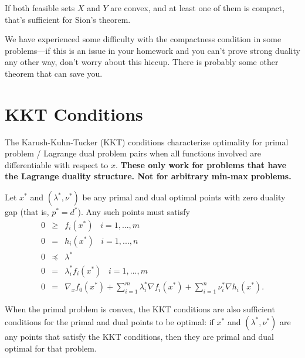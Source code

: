\documentclass[12pt]{article}
\begin{document}
If both feasible sets $X$ and $Y$ are convex, and at least one of them is compact, that's sufficient for Sion's theorem. 

We have experienced some difficulty with the compactness condition in some problems---if this is an issue in your homework and you can't prove strong duality any other way, don't worry about this hiccup. There is probably some other theorem that can save you. 

\pagebreak

\section{KKT Conditions}


The Karush-Kuhn-Tucker (KKT) conditions characterize optimality for primal problem / Lagrange dual problem pairs when all functions involved are differentiable with respect to $x$. \textbf{These only work for problems that have the Lagrange duality structure. Not for arbitrary min-max problems.} 

Let $x^*$ and $(\lambda^*, \nu^*)$ be any primal and dual optimal points with zero duality gap (that is, $p^* = d^*$). Any such points must satisfy
%
\begin{eqnarray*}
0 &\geq& f_i (x^*) \;\;\; i=1,...,m\\
0&=& h_i (x^*) \;\;\; i=1,...,n \\
0 & \preceq & \lambda^* \\
0 &=& \lambda_i^* f_i (x^*) \;\;\; i=1,...,m \\
0 &=& \nabla_x f_0 (x^*) + \sum_{i=1}^m \lambda_i^* \nabla f_i(x^*) + \sum_{i=1}^n \nu_i^* \nabla h_i (x^*).
\end{eqnarray*}

When the primal problem is convex, the KKT conditions are also sufficient conditions for the primal and dual points to be optimal: if $x^*$ and $(\lambda^*, \nu^*)$ are any points that satisfy the KKT conditions, then they are primal and dual optimal for that problem.
\end{document}
